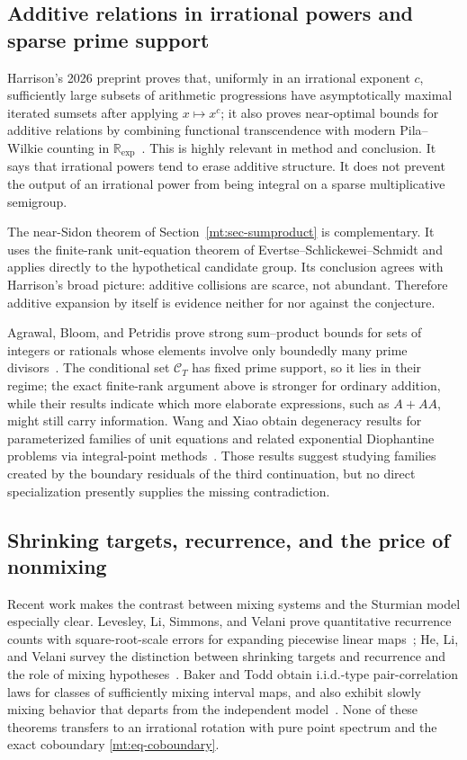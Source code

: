 \documentclass[11pt,oneside]{article}
\theoremstyle{definition}
\theoremstyle{remark}
\newcommand{\R}{\mathbb R}
\newcommand{\Cand}{\mathcal C}
\begin{document}
\subsection{Additive relations in irrational powers and sparse prime support}

Harrison's 2026 preprint proves that, uniformly in an irrational exponent $c$, sufficiently
large subsets of arithmetic progressions have asymptotically maximal iterated sumsets after
applying $x\mapsto x^c$; it also proves near-optimal bounds for additive relations by combining
functional transcendence with modern Pila--Wilkie counting in
$\R_{\exp}$~\cite{Harrison2026}.  This is highly relevant in method and conclusion.  It says
that irrational powers tend to erase additive structure.  It does not prevent the output of
an irrational power from being integral on a sparse multiplicative semigroup.

The near-Sidon theorem of Section~\ref{mt:sec-sumproduct} is complementary.  It uses the
finite-rank unit-equation theorem of Evertse--Schlickewei--Schmidt
\cite{EvertseSchlickeweiSchmidt2002} and applies directly to the hypothetical candidate group.
Its conclusion agrees with Harrison's broad picture: additive collisions are scarce, not
abundant.  Therefore additive expansion by itself is evidence neither for nor against the
conjecture.

Agrawal, Bloom, and Petridis prove strong sum--product bounds for sets of integers or rationals
whose elements involve only boundedly many prime divisors~\cite{AgrawalBloomPetridis2026}.
The conditional set $\Cand_T$ has fixed prime support, so it lies in their regime; the exact
finite-rank argument above is stronger for ordinary addition, while their results indicate
which more elaborate expressions, such as $A+AA$, might still carry information.  Wang and
Xiao obtain degeneracy results for parameterized families of unit equations and related
exponential Diophantine problems via integral-point methods~\cite{WangXiao2026}.  Those results
suggest studying families created by the boundary residuals of the third continuation, but no
direct specialization presently supplies the missing contradiction.

\subsection{Shrinking targets, recurrence, and the price of nonmixing}

Recent work makes the contrast between mixing systems and the Sturmian model especially clear.
Levesley, Li, Simmons, and Velani prove quantitative recurrence counts with square-root-scale
errors for expanding piecewise linear maps~\cite{LevesleyLiSimmonsVelani2025}; He, Li, and
Velani survey the distinction between shrinking targets and recurrence and the role of mixing
hypotheses~\cite{HeLiVelani2025}.  Baker and Todd obtain i.i.d.-type pair-correlation laws for
classes of sufficiently mixing interval maps, and also exhibit slowly mixing behavior that
departs from the independent model~\cite{BakerTodd2026}.  None of these theorems transfers to
an irrational rotation with pure point spectrum and the exact coboundary
\eqref{mt:eq-coboundary}.
\end{document}
